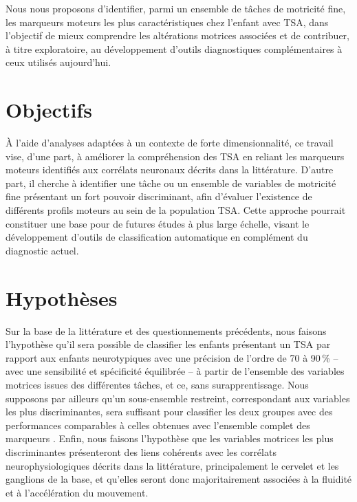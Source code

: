 \bigskip

Nous nous proposons d'identifier, parmi un ensemble de tâches de motricité fine, les marqueurs moteurs les
plus caractéristiques chez l'enfant avec TSA, dans l'objectif de mieux comprendre les altérations motrices associées et de contribuer, à titre exploratoire, au développement d'outils diagnostiques complémentaires à ceux utilisés aujourd'hui.

\section{Objectifs}
À l'aide d'analyses adaptées à un contexte de forte dimensionnalité, ce travail vise, d'une part, à améliorer la compréhension des TSA en reliant les marqueurs moteurs identifiés aux corrélats neuronaux décrits dans la littérature. D'autre part, il cherche à identifier une tâche ou un ensemble de variables de motricité fine présentant un fort pouvoir discriminant, afin d'évaluer l'existence de différents profils moteurs au sein de la population TSA. Cette approche pourrait constituer une base pour de futures études à plus large échelle, visant le développement d'outils de classification automatique en complément du diagnostic actuel.


\section{Hypothèses}
Sur la base de la littérature et des questionnements précédents, nous faisons l'hypothèse qu'il sera possible de classifier les enfants présentant un TSA par rapport aux enfants neurotypiques avec une précision de l'ordre de 70 à 90\,\% -- avec une sensibilité et spécificité équilibrée -- à partir de l'ensemble des variables motrices issues des différentes tâches, et ce, sans surapprentissage. Nous supposons par ailleurs qu'un sous-ensemble restreint, correspondant aux variables les plus discriminantes, sera suffisant pour classifier les deux groupes avec des performances comparables à celles obtenues avec l'ensemble complet des marqueurs%
. Enfin, nous faisons l'hypothèse que les variables motrices les plus discriminantes présenteront des liens cohérents avec les corrélats neurophysiologiques décrits dans la littérature, principalement le cervelet et les ganglions de la base, et qu'elles seront donc majoritairement associées à la fluidité et à l'accélération du mouvement.


